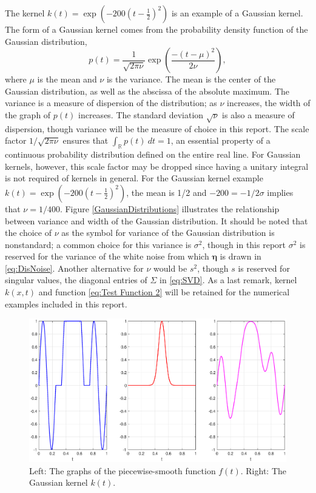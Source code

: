 \documentclass[12pt]{article}
\newcommand{\kcon}{k}
\newcommand{\fcon}{f}
\newcommand{\blurV}{\nu}	%
\newcommand{\noiseSD}{\sigma}	%
\newcommand{\noise}{\bm{\eta}}	%
\begin{document}
The kernel $\kcon(t) = \exp(-200(t-\frac{1}{2})^2)$ is an example of a Gaussian kernel. The form of a Gaussian kernel comes from the probability density function of the Gaussian distribution,
\[p(t) = \frac{1}{\sqrt{2\pi\blurV}}\exp\left(\frac{-(t-\mu)^2}{2\blurV}\right),\]
where $\mu$ is the mean and $\blurV$ is the variance. The mean is the center of the Gaussian distribution, as well as the abscissa of the absolute maximum. The variance is a measure of dispersion of the distribution; as $\blurV$ increases, the width of the graph of $p(t)$ increases. The standard deviation $\sqrt{\blurV}$ is also a measure of dispersion, though variance will be the measure of choice in this report. The scale factor $1/\sqrt{2\pi\blurV}$ ensures that $\int_{\mathbb{R}} p(t) \: dt = 1$, an essential property of a continuous probability distribution defined on the entire real line. For Gaussian kernels, however, this scale factor may be dropped since having a unitary integral is not required of kernels in general.  For the Gaussian kernel example $\kcon(t) = \exp(-200(t-\frac{1}{2})^2)$, the mean is 1/2 and $-200 = -1/2\noiseSD$ implies that $\blurV = 1/400$. Figure \ref{GaussianDistributions} illustrates the relationship between variance and width of the Gaussian distribution. It should be noted that the choice of $\blurV$ as the symbol for variance of the Gaussian distribution is nonstandard; a common choice for this variance is $\sigma^2$, though in this report $\sigma^2$ is reserved for the variance of the white noise from which $\noise$ is drawn in \eqref{eq:DisNoise}. Another alternative for $\blurV$ would be $s^2$, though $s$ is reserved for singular values, the diagonal entries of $\Sigma$ in \eqref{eq:SVD}. As a last remark, kernel $k(x,t)$ and function \eqref{eq:Test Function 2} will be retained for the numerical examples included in this report.

\begin{figure}
	\centerline{\includegraphics[scale=0.4]{Figures/FunctionKernelPlot.eps}}
\caption{Left: The graphs of the piecewise-smooth function $\fcon(t)$. Right: The Gaussian kernel $\kcon(t)$.}
\label{FunctionKernelPlot}
\end{figure}
\end{document}
